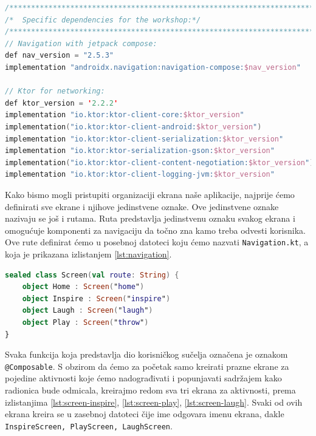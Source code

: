 \documentclass[11pt,a4paper,twoside]{article}
\begin{document}
\begin{lstlisting}[caption={Ovisnosnosti o vanjskim bibliotekama u datoteci build.gradle (Module:app)}, label={lst:dependencies}, language=Kotlin]
/***********************************************************************/
/*  Specific dependencies for the workshop:*/
/***********************************************************************/
// Navigation with jetpack compose:
def nav_version = "2.5.3"
implementation "androidx.navigation:navigation-compose:$nav_version"

// Ktor for networking:
def ktor_version = '2.2.2'
implementation "io.ktor:ktor-client-core:$ktor_version"
implementation("io.ktor:ktor-client-android:$ktor_version")
implementation "io.ktor:ktor-client-serialization:$ktor_version"
implementation "io.ktor:ktor-serialization-gson:$ktor_version"
implementation("io.ktor:ktor-client-content-negotiation:$ktor_version")
implementation "io.ktor:ktor-client-logging-jvm:$ktor_version"
\end{lstlisting}

Kako bismo mogli pristupiti organizaciji ekrana naše aplikacije, najprije ćemo definirati sve ekrane i njihove jedinstvene oznake. Ove jedinstvene oznake nazivaju se još i rutama. Ruta predstavlja jedinstvenu oznaku svakog ekrana i omogućuje komponenti za navigaciju da točno zna kamo treba odvesti korisnika. Ove rute definirat ćemo u posebnoj datoteci koju ćemo nazvati \texttt{Navigation.kt}, a koja je prikazana izlistanjem \ref{lst:navigation}.

\begin{lstlisting}[caption={Navigacija - Navigation.kt}, label={lst:navigation}, language=Kotlin]
sealed class Screen(val route: String) {
	object Home : Screen("home")
	object Inspire : Screen("inspire")
	object Laugh : Screen("laugh")
	object Play : Screen("throw")
}
\end{lstlisting}

Svaka funkcija koja predstavlja dio korisničkog sučelja označena je oznakom \texttt{@Composable}. S obzirom da ćemo za početak samo kreirati prazne ekrane za pojedine aktivnosti koje ćemo nadograđivati i popunjavati sadržajem kako radionica bude odmicala, kreirajmo redom sva tri ekrana za aktivnosti, prema izlistanjima \ref{lst:screen-inspire}, \ref{lst:screen-play}, \ref{lst:screen-laugh}. Svaki od ovih ekrana kreira se u zasebnoj datoteci čije ime odgovara imenu ekrana, dakle \texttt{InspireScreen, PlayScreen, LaughScreen}.
\end{document}

